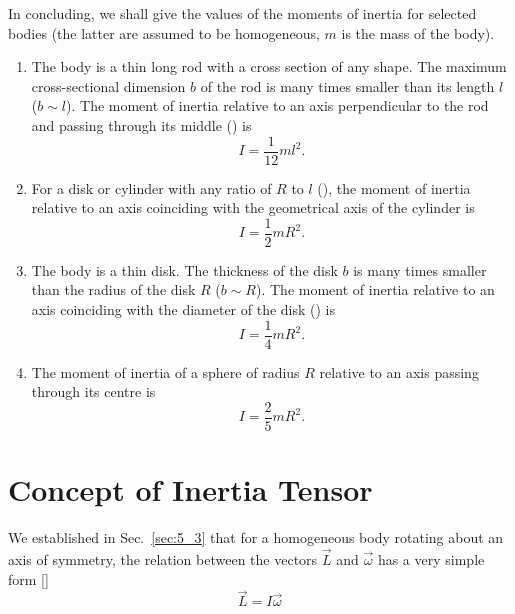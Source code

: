 In concluding, we shall give the values of the moments of inertia for selected bodies (the latter are assumed to be homogeneous, $m$ is the mass of the body).
\begin{enumerate}[1.]
	\item The body is a thin long rod with a cross section of any shape. The maximum cross-sectional dimension $b$ of the rod is many times smaller than its length $l$ ($b\sim l$). The moment of inertia relative to an axis perpendicular to the rod and passing through its middle () is
	\begin{equation}\label{eq:5_25}
	I = \frac{1}{12}ml^2.
	\end{equation}

	\item For a disk or cylinder with any ratio of $R$ to $l$ (), the moment of inertia relative to an axis coinciding with the geometrical axis of the cylinder is
	\begin{equation}\label{eq:5_26}
	I = \frac{1}{2}mR^2.
	\end{equation}

	\item The body is a thin disk. The thickness of the disk $b$ is many times smaller than the radius of the disk $R$ ($b\sim R$). The moment of inertia relative to an axis coinciding with the diameter of the disk () is
	\begin{equation}\label{eq:5_27}
		I = \frac{1}{4}mR^2.
	\end{equation}

	\item The moment of inertia of a sphere of radius $R$  relative to an axis passing through its centre is
	\begin{equation}\label{eq:5_28}
		I = \frac{2}{5}mR^2.
	\end{equation}
\end{enumerate}

\section{Concept of Inertia Tensor}\label{sec:5_5}

We established in Sec.~\ref{sec:5_3} that for a homogeneous body rotating about an axis of symmetry, the relation between the vectors $\vec{L}$ and $\vec{\omega}$ has a very simple form []
\begin{equation*}
\vec{L} = I\vec{\omega}
\end{equation*}

